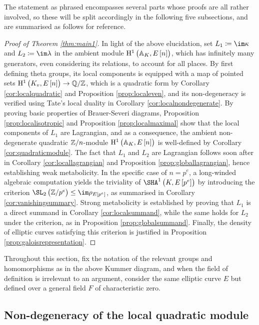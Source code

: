 The statement as phrased encompasses several parts whose proofs are all rather involved, so these will be split accordingly in the following five subsections, and are summarised as follows for reference.

\begin{proof}[Proof of Theorem \ref{thm:main1}]
In light of the above elucidation, set $ L_1 \coloneqq \im \kappa $ and $ L_2 \coloneqq \im \lambda $ in the ambient module $ \HE[n]{\AA_K} $, which has infinitely many generators, even considering its relations, to account for all places. By first defining theta groups, its local components is equipped with a map of pointed sets $ \HE[n]{K_v} \to \QQ / \ZZ $, which is a quadratic form by Corollary \ref{cor:localquadratic} and Proposition \ref{prop:localeven}, and its non-degeneracy is verified using Tate's local duality in Corollary \ref{cor:localnondegenerate}. By proving basic properties of Brauer-Severi diagrams, Proposition \ref{prop:localisotropic} and Proposition \ref{prop:localmaximal} show that the local components of $ L_1 $ are Lagrangian, and as a consequence, the ambient non-degenerate quadratic $ \mathbb{Z} / n $-module $ \HE[n]{\AA_K} $ is well-defined by Corollary \ref{cor:quadraticmodule}. The fact that $ L_1 $ and $ L_2 $ are Lagrangian follows soon after in Corollary \ref{cor:locallagrangian} and Proposition \ref{prop:globallagrangian}, hence establishing weak metabolicity. In the specific case of $ n = p^e $, a long-winded algebraic computation yields the triviality of $ \Sha[K, E\sbr{p^e}] $ by introducing the criterion $ \SL_2\br{\ZZ / p^e} \le \im \rho_{E\sbr{p^e}} $, as summarised in Corollary \ref{cor:vanishingsummary}. Strong metabolicity is established by proving that $ L_1 $ is a direct summand in Corollary \ref{cor:localsummand}, while the same holds for $ L_2 $ under the criterion, as in Proposition \ref{prop:globalsummand}. Finally, the density of elliptic curves satisfying this criterion is justified in Proposition \ref{prop:galoisrepresentation}.
\end{proof}

Throughout this section, fix the notation of the relevant groups and homomorphisms as in the above Kummer diagram, and when the field of definition is irrelevant to an argument, consider the same elliptic curve $ E $ but defined over a general field $ F $ of characteristic zero.

\subsection{Non-degeneracy of the local quadratic module}

